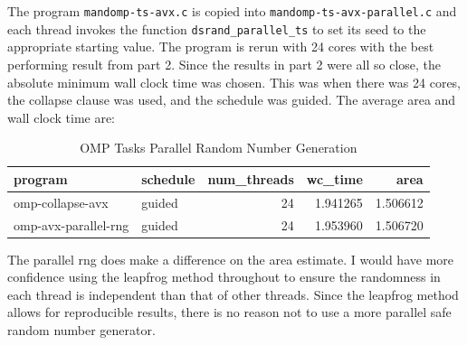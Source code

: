 \documentclass{article}
\begin{document}
The program \texttt{mandomp-ts-avx.c} is copied into \texttt{mandomp-ts-avx-parallel.c} and each thread 
invokes the function \texttt{dsrand\_parallel\_ts} to set its seed to the appropriate starting value. The 
program is rerun with 24 cores with the best performing result from part 2. Since the results in part 2 
were all so close, the absolute minimum wall clock time was chosen. This was when there was 24 cores, the collapse clause was 
used, and the schedule was guided. The average area and wall clock time are:
\begin{table}[H]
    \centering
    \caption{OMP Tasks Parallel Random Number Generation}
    \fontsize{12}{14}\selectfont
    \begin{tabular}[t]{l|l|r|r|r}
    \hline
    program & schedule & num\_threads & wc\_time & area\\
    \hline
    omp-collapse-avx & guided & 24 & 1.941265 & 1.506612\\
    \hline
    omp-avx-parallel-rng & guided & 24 & 1.953960 & 1.506720\\
    \hline
    \end{tabular}
\end{table}
\noindent The parallel rng does make a difference on the area estimate. I would 
have more confidence using the leapfrog method throughout to ensure the randomness 
in each thread is independent than that of other threads. Since the leapfrog method allows 
for reproducible results, there is no reason not to use a more parallel safe random number generator.
\end{document}
